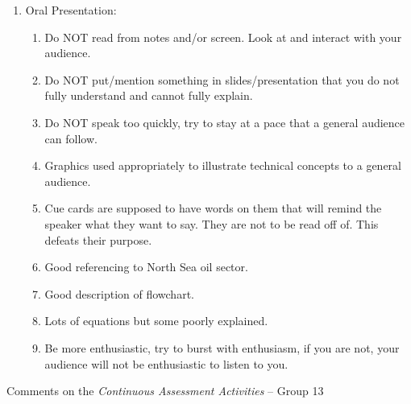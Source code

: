 \documentclass[14pt,twoside]{report}
\begin{document}
\begin{enumerate}
\item Oral Presentation:
\begin{enumerate}
%
\item Do NOT read from notes and/or screen. Look at and interact with your audience.
%
\item Do NOT put/mention something in slides/presentation that you do not fully understand and cannot fully explain.
%
\item Do NOT speak too quickly, try to stay at a pace that a general audience can follow.
%
\item Graphics used appropriately to illustrate technical concepts to a general audience. 
%
\item Cue cards are supposed to have words on them that will remind the speaker what they want to say. They are not to be read off of. This defeats their purpose.
%
\item Good referencing to North Sea oil sector.
%
\item Good description of flowchart.
%
\item Lots of equations but some poorly explained.
%
\item Be more enthusiastic, try to burst with enthusiasm, if you are not, your audience will not be enthusiastic to listen to you.
%
\end{enumerate}

\end{enumerate}


\clearpage



\bigskip

\begin{center}
  {\Large Comments on the {\it Continuous Assessment Activities} -- Group 13}
\end{center}
\end{document}
